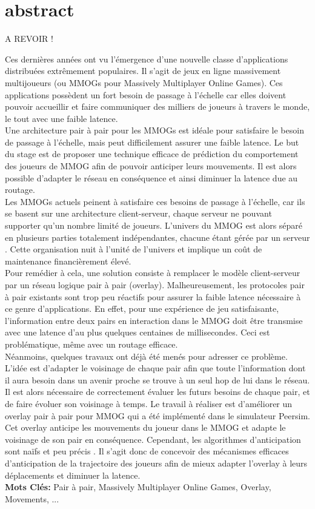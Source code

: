 \section{abstract}

A REVOIR !
	
	Ces dernières années ont vu l’émergence d’une nouvelle classe d’applications distribuées extrêmement populaires. Il s’agit de jeux en ligne massivement multijoueurs (ou MMOGs pour Massively Multiplayer Online Games). Ces applications possèdent un fort besoin de passage à l’échelle car elles doivent pouvoir accueillir et faire communiquer des milliers de joueurs à travers le monde, le tout avec une faible latence.\\
Une architecture pair à pair pour les MMOGs est idéale pour satisfaire le besoin de passage à l’échelle, mais peut difficilement assurer une faible latence. Le but du stage est de proposer une technique efficace de prédiction du comportement des joueurs de MMOG afin de pouvoir anticiper leurs mouvements. Il est alors possible d’adapter le réseau en conséquence et ainsi diminuer la latence due au routage.\\
Les MMOGs actuels peinent à satisfaire ces besoins de passage à l’échelle, car ils se basent sur une architecture client-serveur, chaque serveur ne pouvant supporter qu’un nombre limité de joueurs. L’univers du MMOG est alors séparé en plusieurs parties totalement indépendantes, chacune étant gérée par un serveur . Cette organisation nuit à l’unité de l’univers et implique un coût de maintenance financièrement élevé.\\
Pour remédier à cela, une solution consiste à remplacer le modèle client-serveur par un réseau logique pair à pair (overlay). Malheureusement, les protocoles pair à pair existants sont trop peu réactifs pour assurer la faible latence nécessaire à ce genre d’applications. En effet, pour une expérience de jeu satisfaisante, l’information entre deux pairs en interaction dans le MMOG doit être transmise avec une latence d’au plus quelques centaines de millisecondes. Ceci est problématique, même avec un routage efficace.\\
Néanmoins, quelques travaux ont déjà été menés pour adresser ce problème. L’idée est d’adapter le voisinage de chaque pair afin que toute l’information dont il aura besoin dans un avenir proche se trouve à un seul hop de lui dans le réseau. Il est alors nécessaire de correctement évaluer les futurs besoins de chaque pair, et de faire évoluer son voisinage à temps.
Le travail à réaliser est d'améliorer un overlay pair à pair pour MMOG qui a été implémenté dans le simulateur Peersim. Cet overlay anticipe les mouvements du joueur dans le MMOG et adapte le voisinage de son pair en conséquence. Cependant, les algorithmes d’anticipation sont naïfs et peu précis .
Il s’agit donc de concevoir des mécanismes efficaces d’anticipation de la trajectoire des joueurs afin de mieux adapter l’overlay à leurs déplacements et diminuer la latence.\\

\textbf{Mots Clés:} Pair à pair, Massively Multiplayer Online Games, Overlay, Movements, ...
